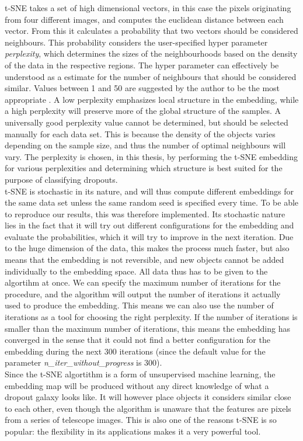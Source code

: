 t-SNE takes a set of high dimensional vectors, in this case the pixels originating from four different images, and computes the euclidean distance between each vector. From this it calculates a probability that two vectors should be considered neighbours. This probability considers the user-specified hyper parameter \textit{perplexity}, which determines the sizes of the neighbourhoods based on the density of the data in the respective regions. The hyper parameter can effectively be understood as a estimate for the number of neighbours that should be considered similar. Values between 1 and 50 are suggested by the author to be the most appropriate \cite{Maaten_2008_tSNE}. A low perplexity emphasizes local structure in the embedding, while a high perplexity will preserve more of the global structure of the samples. A universally good perplexity value cannot be determined, but should be selected manually for each data set. This is because the density of the objects varies depending on the sample size, and thus the number of optimal neighbours will vary. The perplexity is chosen, in this thesis, by performing the t-SNE embedding for various perplexities and determining which structure is best suited for the purpose of classifying dropouts. \\
t-SNE is stochastic in its nature, and will thus compute different embeddings for the same data set unless the same random seed is specified every time. To be able to reproduce our results, this was therefore implemented. Its stochastic nature lies in the fact that it will try out different configurations for the embedding and evaluate the probabilities, which it will try to improve in the next iteration. Due to the huge dimension of the data, this makes the process much faster, but also means that the embedding is not reversible, and new objects cannot be added individually to the embedding space. All data thus has to be given to the algortihm at once. We can specify the maximum number of iterations for the procedure, and the algorithm will output the number of iterations it actually used to produce the embedding. This means we can also use the number of iterations as a tool for choosing the right perplexity. If the number of iterations is smaller than the maximum number of iterations, this means the embedding has converged in the sense that it could not find a better configuration for the embedding during the next 300 iterations (since the default value for the parameter \textit{n\_iter\_without\_progress} is 300). \\
Since the t-SNE algortithm is a form of unsupervised machine learning, the embedding map will be produced without any direct knowledge of what a dropout galaxy looks like. It will however place objects it considers similar close to each other, even though the algorithm is unaware that the features are pixels from a series of telescope images. This is also one of the reasons t-SNE is so popular: the flexibility in its applications makes it a very powerful tool.

